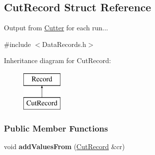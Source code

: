 \hypertarget{structCutRecord}{
\subsection{CutRecord Struct Reference}
\label{structCutRecord}
}


Output from \hyperlink{classCutter}{Cutter} for each run...  




{\ttfamily \#include $<$DataRecords.h$>$}

Inheritance diagram for CutRecord:\begin{figure}[H]
\begin{center}
\leavevmode
\includegraphics[height=2.000000cm]{structCutRecord}
\end{center}
\end{figure}
\subsubsection*{Public Member Functions}
\begin{DoxyCompactItemize}
\item 
\hypertarget{structCutRecord_a92a14da954641fc1d4803c6b1984b71f}{
void {\bfseries addValuesFrom} (\hyperlink{structCutRecord}{CutRecord} \&cr)}
\label{structCutRecord_a92a14da954641fc1d4803c6b1984b71f}

\end{DoxyCompactItemize}
